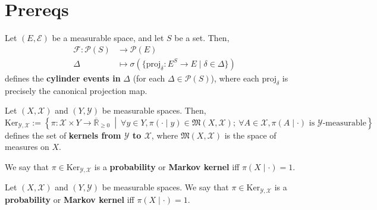 \chapter{Prereqs}

\begin{definition}
    \label{def:cylinder-event}
    \leanok

    Let $(E,\mathcal{E})$ be a measurable space, and let $S$ be a set. Then,
    \begin{align}
        \mathcal{F}:\mathcal{P}(S)&\to\mathcal{P}(E)\\
        \Delta&\mapsto \sigma(\{\text{proj}_\delta:E^S\to E\mid \delta\in \Delta\})
    \end{align}
    defines the \textbf{cylinder events in }$\Delta$ (for each $\Delta\in\mathcal{P}(S)$), where each $\text{proj}_\delta$ is precisely the canonical projection map.
\end{definition}

\begin{definition}[Kernel]
    \label{def:kernel}
    \leanok

    Let $(X,\mathcal{X})$ and $(Y,\mathcal{Y})$ be measurable spaces. Then,
    \begin{equation*}
        \text{Ker}_{\mathcal{Y},\mathcal{X}}:=\left\{\pi:\mathcal{X}\times Y\to\overline{\mathbb{R}}_{\geq0}~\middle\vert~ \forall y\in Y,\pi(\cdot\mid y)\in\mathfrak{M}(X,\mathcal{X});~\forall A\in\mathcal{X},\pi(A\mid\cdot)\text{ is }\mathcal{Y}\text{-measurable}\right\}
    \end{equation*}
    defines the set of \textbf{kernels from $\mathcal{Y}$ to $\mathcal{X}$}, where $\mathfrak{M}(X,\mathcal{X})$ is the space of measures on $X$.

    We say that $\pi\in\text{Ker}_{\mathcal{Y},\mathcal{X}}$ is a \textbf{probability} or \textbf{Markov kernel} iff $\pi(X\mid \cdot)=1$.
\end{definition}

\begin{definition}
    \label{def:markov-kernel}
    \leanok

    Let $(X,\mathcal{X})$ and $(Y,\mathcal{Y})$ be measurable spaces. We say that $\pi\in\text{Ker}_{\mathcal{Y},\mathcal{X}}$ is a \textbf{probability} or \textbf{Markov kernel} iff $\pi(X\mid \cdot)=1$.
\end{definition}

